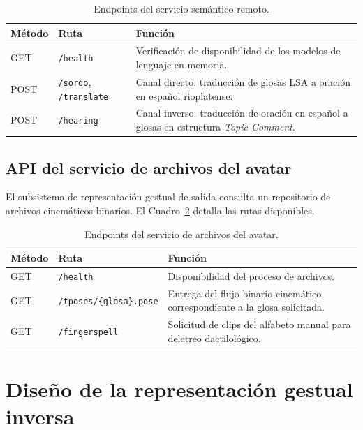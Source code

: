 \begin{table}[htbp]
  \centering
  \caption{Endpoints del servicio semántico remoto.}
  \label{tab:api-semantico-endpoints}
  \begin{tabular}{@{}llp{8.2cm}@{}}
    \toprule
    Método & Ruta & Función \\
    \midrule
    GET & \texttt{/health} & Verificación de disponibilidad de los modelos de lenguaje en memoria. \\
    POST & \texttt{/sordo}, \texttt{/translate} & Canal directo: traducción de glosas LSA a oración en español rioplatense. \\
    POST & \texttt{/hearing} & Canal inverso: traducción de oración en español a glosas en estructura \textit{Topic-Comment}. \\
    \bottomrule
  \end{tabular}
\end{table}

\subsection{API del servicio de archivos del avatar}
\label{sec:api-avatar}
El subsistema de representación gestual de salida consulta un repositorio de archivos cinemáticos binarios. El Cuadro~\ref{tab:api-avatar-endpoints} detalla las rutas disponibles.

\begin{table}[htbp]
  \centering
  \caption{Endpoints del servicio de archivos del avatar.}
  \label{tab:api-avatar-endpoints}
  \begin{tabular}{@{}llp{7.6cm}@{}}
    \toprule
    Método & Ruta & Función \\
    \midrule
    GET & \texttt{/health} & Disponibilidad del proceso de archivos. \\
    GET & \texttt{/tposes/\{glosa\}.pose} & Entrega del flujo binario cinemático correspondiente a la glosa solicitada. \\
    GET & \texttt{/fingerspell} & Solicitud de clips del alfabeto manual para deletreo dactilológico. \\
    \bottomrule
  \end{tabular}
\end{table}

\section{Diseño de la representación gestual inversa}
\label{sec:repr_inversa}

